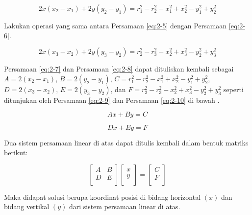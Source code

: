 \begin{equation}
	2x \left(x_2-x_1\right) + 2y \left(y_2 - y_1\right) = r_1^2 - r_2^2 - x_1^2 + x_2^2- y_1^2 + y_2^2
	\label{eq:2-7}
\end{equation}

Lakukan operasi yang sama antara Persamaan  \ref{eq:2-5} dengan Persamaan \ref{eq:2-6}.

\begin{equation}
	2x \left(x_3 -x_2\right) + 2y \left(y_3 - y_2\right) = r_2^2 - r_3^2 - x_2^2 + x_3^2- y_2^2 + y_3^2
	\label{eq:2-8}
\end{equation}

Persamaan \ref{eq:2-7} dan Persamaan \ref{eq:2-8} dapat dituliskan kembali sebagai $A = 2 \left(x_2-x_1\right)$, $B = 2 \left(y_2 - y_1\right)$, $C = r_1^2 - r_2^2 - x_1^2 + x_2^2- y_1^2 + y_2^2$, $D = 2 \left(x_3 -x_2\right)$, $E = 2 \left(y_3 - y_2\right) $, dan $F= r_2^2 - r_3^2 - x_2^2 + x_3^2- y_2^2 + y_3^2$ seperti ditunjukan oleh Persamaan \ref{eq:2-9} dan Persamaan \ref{eq:2-10} di bawah .

\begin{equation}
	Ax + By = C
	\label{eq:2-9}
\end{equation}

\begin{equation}
	Dx + Ey = F
	\label{eq:2-10}
\end{equation}

Dua sistem persamaan linear di atas dapat ditulis kembali dalam bentuk matriks berikut:

\begin{equation}
	\begin{bmatrix}
		A & B \\
		D & E \\
	\end{bmatrix}
	\begin{bmatrix}
		x \\
		y\\
	\end{bmatrix} = 
	\begin{bmatrix}
		C \\
		F \\
	\end{bmatrix}
	\label{eq:2-11}
\end{equation}

Maka didapat solusi berupa koordinat posisi di bidang horizontal $\left(x\right)$ dan bidang vertikal $\left(y\right)$ dari sistem persamaan linear di atas.

